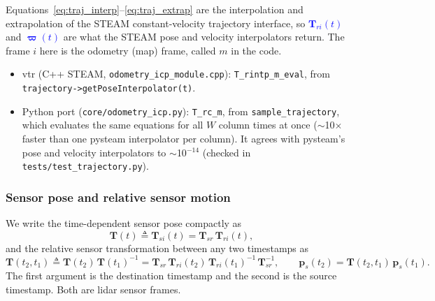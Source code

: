 Equations~\eqref{eq:traj_interp}--\eqref{eq:traj_extrap} are the interpolation and extrapolation of the STEAM constant-velocity trajectory interface, so \textcolor{blue}{$\mathbf{T}_{ri}(t)$} and \textcolor{blue}{$\bm{\varpi}(t)$} are what the STEAM pose and velocity interpolators return. The frame $i$ here is the odometry (map) frame, called $m$ in the code.
\begin{itemize}
    \item vtr (C++ STEAM, \texttt{odometry\_icp\_module.cpp}): \texttt{T\_rintp\_m\_eval}, from \\ \texttt{trajectory->getPoseInterpolator(t)}.
    \item Python port (\texttt{core/odometry\_icp.py}): \texttt{T\_rc\_m}, from \texttt{sample\_trajectory}, which evaluates the same equations for all $W$ column times at once ($\sim$10$\times$ faster than one pysteam interpolator per column). It agrees with pysteam's pose and velocity interpolators to $\sim$10$^{-14}$ (checked in \texttt{tests/test\_trajectory.py}).
\end{itemize}

\subsubsection{Sensor pose and relative sensor motion}
We write the time-dependent sensor pose compactly as
\begin{equation}
    \label{eq:sensor_pose}
    \mathbf{T}(t) \triangleq \mathbf{T}_{si}(t) = \mathbf{T}_{sr}\,\mathbf{T}_{ri}(t),
\end{equation}
and the relative sensor transformation between any two timestamps as
\begin{equation}
    \label{eq:rel_pose}
    \mathbf{T}(t_2, t_1) \triangleq \mathbf{T}(t_2)\,\mathbf{T}(t_1)^{-1}
    = \mathbf{T}_{sr}\,\mathbf{T}_{ri}(t_2)\,\mathbf{T}_{ri}(t_1)^{-1}\,\mathbf{T}_{sr}^{-1}, \qquad
    \mathbf{p}_s(t_2) = \mathbf{T}(t_2, t_1)\,\mathbf{p}_s(t_1).
\end{equation}
The first argument is the destination timestamp and the second is the source timestamp. Both are lidar sensor frames.


